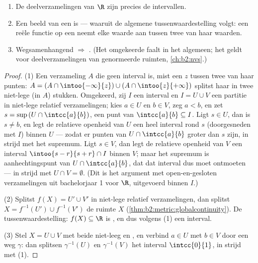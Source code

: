 \begin{theorem}\label{thm:b2:metric:connectedness}
\begin{enumerate}
  \item De  deelverzamelingen van $\R$ zijn precies de
        intervallen.
  \item Een  beeld van een  is
         --- waaruit de algemene tussenwaardestelling
        volgt: een  reële functie op een  neemt elke waarde aan tussen twee van haar waarden.
  \item Wegsamenhangend $\Rightarrow$ . (Het omgekeerde
        faalt in het algemeen; het geldt voor 
        deelverzamelingen van genormeerde ruimten,
        \cref{ch:b2:nvs}.)
\end{enumerate}
\end{theorem}

\begin{proof}
(1) Een verzameling $A$ die geen interval is, mist een $z$ tussen
twee van haar punten: $A = (A \cap \intoo{-\infty}{z}) \cup (A \cap
\intoo{z}{+\infty})$ splitst haar in twee niet-lege (in $A$) 
stukken. Omgekeerd, zij $I$ een interval en $I = U \cup V$ een
partitie in niet-lege relatief  verzamelingen; kies $a \in U$
en $b \in V$, zeg $a < b$, en zet $s = \sup\,(U \cap
\intcc{a}{b})$, een punt van $\intcc{a}{b} \subseteq I$. Ligt $s
\in U$, dan is $s \neq b$, en legt de relatieve openheid van $U$
een heel interval rond $s$ (doorgesneden met $I$) binnen $U$ ---
zodat er punten van $U \cap \intcc{a}{b}$ groter dan $s$ zijn, in
strijd met het supremum. Ligt $s \in V$, dan legt de relatieve
openheid van $V$ een interval $\intoo{s - r}{s + r} \cap I$ binnen
$V$; maar het supremum is aanhechtingspunt van $U \cap
\intcc{a}{b}$, dat dat interval dus moet ontmoeten --- in strijd
met $U \cap V = \emptyset$. (Dit is het argument met open-en-gesloten
verzamelingen uit bachelorjaar 1 voor $\R$, uitgevoerd binnen $I$.)

(2) Splitst $f(X) = U' \cup V'$ in niet-lege relatief 
verzamelingen, dan splitst $X = f^{-1}(U') \cup f^{-1}(V')$ de
ruimte $X$ (\cref{thm:b2:metric:globalcontinuity}). De
tussenwaardestelling: $f(X) \subseteq \R$ is , en dus
volgens (1) een interval.

(3) Stel $X = U \cup V$ met beide niet-leeg en , en verbind $a
\in U$ met $b \in V$ door een weg $\gamma$: dan splitsen
$\gamma^{-1}(U)$ en $\gamma^{-1}(V)$ het interval $\intcc{0}{1}$,
in strijd met (1).
\end{proof}

